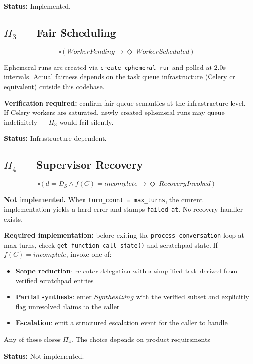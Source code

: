 \textbf{Status:} Implemented.

\subsection*{$\Pi_3$ — Fair Scheduling}

\[ \square \left( WorkerPending \rightarrow \Diamond\ WorkerScheduled \right) \]

Ephemeral runs are created via \texttt{create\_ephemeral\_run} and polled at 2.0s
intervals. Actual fairness depends on the task queue infrastructure (Celery or
equivalent) outside this codebase.

\textbf{Verification required:} confirm fair queue semantics at the infrastructure
level. If Celery workers are saturated, newly created ephemeral runs may queue
indefinitely — $\Pi_3$ would fail silently.

\textbf{Status:} Infrastructure-dependent.

\subsection*{$\Pi_4$ — Supervisor Recovery}

\[ \square \left( d = D_S \wedge f(C) = incomplete \rightarrow \Diamond\ RecoveryInvoked \right) \]

\textbf{Not implemented.} When \texttt{turn\_count = max\_turns}, the current
implementation yields a hard error and stamps \texttt{failed\_at}. No recovery
handler exists.

\textbf{Required implementation:} before exiting the \texttt{process\_conversation}
loop at max turns, check \texttt{get\_function\_call\_state()} and scratchpad state.
If $f(C) = incomplete$, invoke one of:

\begin{itemize}
  \item \textbf{Scope reduction}: re-enter delegation with a simplified task derived
        from verified scratchpad entries
  \item \textbf{Partial synthesis}: enter $Synthesizing$ with the verified subset
        and explicitly flag unresolved claims to the caller
  \item \textbf{Escalation}: emit a structured escalation event for the caller to handle
\end{itemize}

Any of these closes $\Pi_4$. The choice depends on product requirements.

\textbf{Status:} Not implemented.

